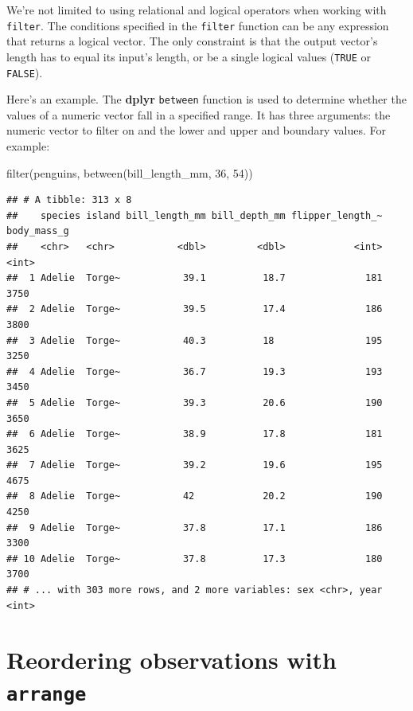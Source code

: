 \documentclass[
]{book}
\newenvironment{Shaded}{\begin{snugshade}}{\end{snugshade}}
\newcommand{\DecValTok}[1]{\textcolor[rgb]{0.00,0.00,0.81}{#1}}
\newcommand{\FunctionTok}[1]{\textcolor[rgb]{0.00,0.00,0.00}{#1}}
\newcommand{\NormalTok}[1]{#1}
\begin{document}
We're not limited to using relational and logical operators when working with \texttt{filter}. The conditions specified in the \texttt{filter} function can be any expression that returns a logical vector. The only constraint is that the output vector's length has to equal its input's length, or be a single logical values (\texttt{TRUE} or \texttt{FALSE}).

Here's an example. The \textbf{dplyr} \texttt{between} function is used to determine whether the values of a numeric vector fall in a specified range. It has three arguments: the numeric vector to filter on and the lower and upper and boundary values. For example:

\begin{Shaded}
\begin{Highlighting}[]
\FunctionTok{filter}\NormalTok{(penguins, }\FunctionTok{between}\NormalTok{(bill\_length\_mm, }\DecValTok{36}\NormalTok{, }\DecValTok{54}\NormalTok{))}
\end{Highlighting}
\end{Shaded}

\begin{verbatim}
## # A tibble: 313 x 8
##    species island bill_length_mm bill_depth_mm flipper_length_~ body_mass_g
##    <chr>   <chr>           <dbl>         <dbl>            <int>       <int>
##  1 Adelie  Torge~           39.1          18.7              181        3750
##  2 Adelie  Torge~           39.5          17.4              186        3800
##  3 Adelie  Torge~           40.3          18                195        3250
##  4 Adelie  Torge~           36.7          19.3              193        3450
##  5 Adelie  Torge~           39.3          20.6              190        3650
##  6 Adelie  Torge~           38.9          17.8              181        3625
##  7 Adelie  Torge~           39.2          19.6              195        4675
##  8 Adelie  Torge~           42            20.2              190        4250
##  9 Adelie  Torge~           37.8          17.1              186        3300
## 10 Adelie  Torge~           37.8          17.3              180        3700
## # ... with 303 more rows, and 2 more variables: sex <chr>, year <int>
\end{verbatim}

\hypertarget{reordering-observations-with-arrange}{%
\section{\texorpdfstring{Reordering observations with \texttt{arrange}}{Reordering observations with arrange}}\label{reordering-observations-with-arrange}}
\end{document}
